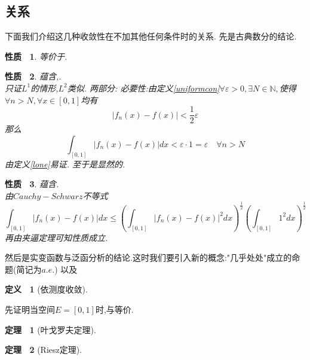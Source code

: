 \documentclass{ctexbook}
\theoremstyle{plain}
\newtheorem{thm}{定理~}[chapter]
\newtheorem{prop}{性质~}[chapter]
\theoremstyle{definition}
\newtheorem{defn}{定义~}[chapter]
\begin{document}
\subsection{关系}
下面我们介绍这几种收敛性在不加其他任何条件时的关系.
先是古典数分的结论.
\begin{prop}
{\songti{}等价于}.
\end{prop}

\begin{prop}
{\songti{}蕴含,}.\\
只证$L^1$的情形,$L^2$类似.
两部分:
必要性:由定义\ref{uniformcon}$\forall \varepsilon >0,\exists N\in \mathbb{N},$使得$\forall n>N,\forall x\in[0,1]$均有
\[|f_n(x)-f(x)|<\frac{1}{2}\varepsilon\]
那么
\[\int_{[0,1]}|f_n(x)-f(x)|dx<\varepsilon \cdot 1=\varepsilon \quad \forall n>N\]
由定义\ref{lone}易证.
至于是显然的.
\end{prop}

\begin{prop}
{\songti{}蕴含}.\\
由$Cauchy-Schwarz$不等式
\[\int_{[0,1]}|f_n(x)-f(x)|dx \leq \left( \int_{[0,1]}|f_n(x)-f(x)|^2dx\right)^\frac{1}{2}\left( \int_{[0,1]}1^2dx\right)^\frac{1}{2}  \]
再由夹逼定理可知性质成立.
\end{prop}
然后是实变函数与泛函分析的结论.这时我们要引入新的概念:"几乎处处"成立的命题(简记为$a.e.$)
以及
\begin{defn}[依测度收敛]\label{mcon}
\end{defn}
先证明当空间$E=[0,1]$时,与等价.
\begin{thm}[叶戈罗夫定理]
\end{thm}
\begin{thm}[Riesz定理]
\end{thm}
\end{document}
